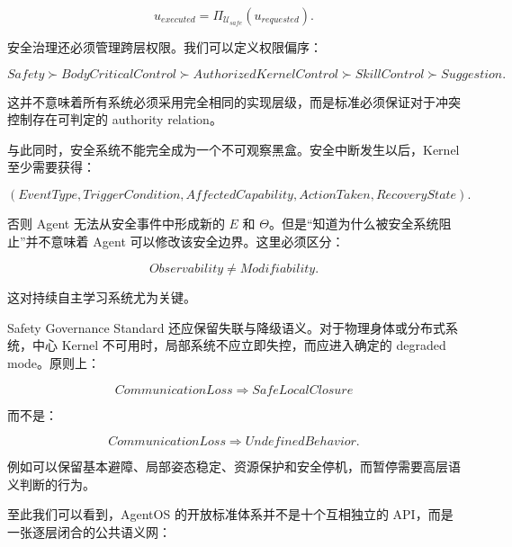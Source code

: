 \[
u_{executed}
=
\Pi_{\mathcal U_{safe}}
(
u_{requested}
).
\]

安全治理还必须管理跨层权限。我们可以定义权限偏序：

\[
Safety
\succ
BodyCriticalControl
\succ
AuthorizedKernelControl
\succ
SkillControl
\succ
Suggestion.
\]

这并不意味着所有系统必须采用完全相同的实现层级，而是标准必须保证对于冲突控制存在可判定的 authority relation。

与此同时，安全系统不能完全成为一个不可观察黑盒。安全中断发生以后，Kernel 至少需要获得：

\[
(
EventType,
TriggerCondition,
AffectedCapability,
ActionTaken,
RecoveryState
).
\]

否则 Agent 无法从安全事件中形成新的 $E$ 和 $\Theta$。但是``知道为什么被安全系统阻止''并不意味着 Agent 可以修改该安全边界。这里必须区分：

\[
Observability
\neq
Modifiability.
\]

这对持续自主学习系统尤为关键。

Safety Governance Standard 还应保留失联与降级语义。对于物理身体或分布式系统，中心 Kernel 不可用时，局部系统不应立即失控，而应进入确定的 degraded mode。原则上：

\[
CommunicationLoss
\Rightarrow
SafeLocalClosure
\]

而不是：

\[
CommunicationLoss
\Rightarrow
UndefinedBehavior.
\]

例如可以保留基本避障、局部姿态稳定、资源保护和安全停机，而暂停需要高层语义判断的行为。

至此我们可以看到，AgentOS 的开放标准体系并不是十个互相独立的 API，而是一张逐层闭合的公共语义网：

\begin{statementbox}
\centering
{}
\end{statementbox}

